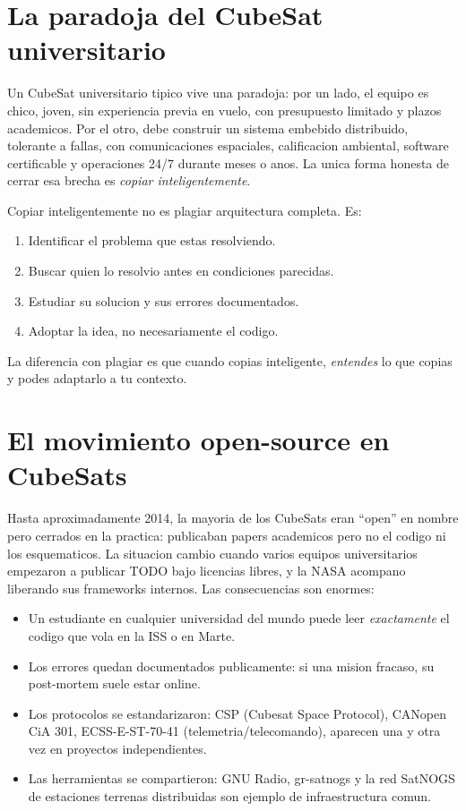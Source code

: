 \documentclass[11pt,a4paper,oneside,openright]{book}
\begin{document}
\section{La paradoja del CubeSat universitario}

Un CubeSat universitario tipico vive una paradoja: por un lado, el equipo
es chico, joven, sin experiencia previa en vuelo, con presupuesto limitado
y plazos academicos. Por el otro, debe construir un sistema embebido
distribuido, tolerante a fallas, con comunicaciones espaciales,
calificacion ambiental, software certificable y operaciones 24/7 durante
meses o anos. La unica forma honesta de cerrar esa brecha es \emph{copiar
inteligentemente}.

\begin{intui}
Copiar inteligentemente no es plagiar arquitectura completa. Es:
\begin{enumerate}[leftmargin=2em]
  \item Identificar el problema que estas resolviendo.
  \item Buscar quien lo resolvio antes en condiciones parecidas.
  \item Estudiar su solucion y sus errores documentados.
  \item Adoptar la idea, no necesariamente el codigo.
\end{enumerate}
La diferencia con plagiar es que cuando copias inteligente,
\emph{entendes} lo que copias y podes adaptarlo a tu contexto.
\end{intui}

\section{El movimiento open-source en CubeSats}

Hasta aproximadamente 2014, la mayoria de los CubeSats eran ``open'' en
nombre pero cerrados en la practica: publicaban papers academicos pero
no el codigo ni los esquematicos. La situacion cambio cuando varios
equipos universitarios empezaron a publicar TODO bajo licencias libres,
y la NASA acompano liberando sus frameworks internos. Las consecuencias
son enormes:

\begin{itemize}[leftmargin=2em]
  \item Un estudiante en cualquier universidad del mundo puede leer
    \emph{exactamente} el codigo que vola en la ISS o en Marte.
  \item Los errores quedan documentados publicamente: si una mision
    fracaso, su post-mortem suele estar online.
  \item Los protocolos se estandarizaron: CSP (Cubesat Space Protocol),
    CANopen CiA 301, ECSS-E-ST-70-41 (telemetria/telecomando), aparecen
    una y otra vez en proyectos independientes.
  \item Las herramientas se compartieron: GNU Radio, gr-satnogs y la
    red SatNOGS de estaciones terrenas distribuidas son ejemplo de
    infraestructura comun.
\end{itemize}
\end{document}
